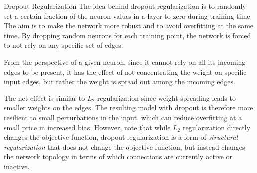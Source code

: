 %
%
\begin{frame}{Dropout Regularization}
The idea behind dropout regularization is to randomly set a certain
fraction of the neuron values in a layer to zero during training time. The aim is to make the
network more robust and to avoid overfitting at the same time. By
dropping random neurons for each training point, the network is forced
to not rely on any specific set of edges. 

\medskip

From the perspective of a
given neuron, since it cannot rely on all its incoming edges to be
present, it has the effect of not concentrating the weight on specific
input edges, but rather the weight is spread out among
the incoming edges. 


\medskip

The net effect is similar to $L_2$ regularization since weight
spreading leads to smaller weights on the edges. The resulting model
with dropout is therefore more resilient to small perturbations in the
input, which can
reduce overfitting at a small price in increased bias. However, note
that while $L_2$ regularization directly changes the objective function,
dropout regularization is a form of {\em structural regularization} that
does not change the objective function, but instead changes the
network topology in terms of which connections are currently active or
inactive.
\end{frame}

